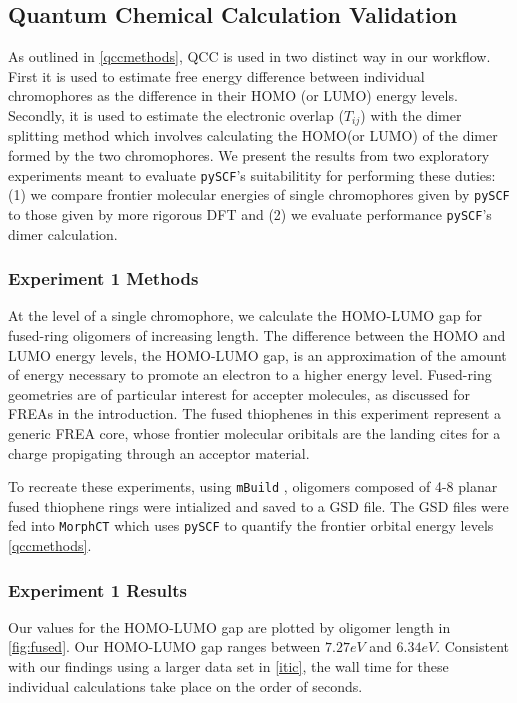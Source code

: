 \label{validation}

\subsection{Quantum Chemical Calculation Validation}

As outlined in \autoref{qccmethods}, QCC is used in two distinct way in our workflow. 
First it is used to estimate free energy
difference between individual chromophores as the difference in their HOMO (or LUMO) energy levels.
Secondly, it is used to estimate the electronic overlap ($T_{ij}$) with the dimer splitting method which involves
calculating the HOMO(or LUMO) of the dimer formed by the two chromophores. We present the results from two
exploratory experiments meant to evaluate \texttt{pySCF}'s suitabilitity for performing these duties:
(1) we compare frontier molecular energies of single chromophores given by \texttt{pySCF} to those
given by more rigorous DFT and (2) we evaluate performance \texttt{pySCF}'s dimer calculation.

\subsubsection{Experiment 1 Methods}

At the level of a single chromophore, we calculate the HOMO-LUMO gap for fused-ring
oligomers of increasing length. 
The difference between the HOMO and LUMO energy levels, the HOMO-LUMO gap, is an approximation of the amount
of energy necessary to promote an electron to a higher energy level.  
Fused-ring geometries are of particular interest for accepter
molecules, as discussed for FREAs in the introduction. 
The fused thiophenes in this experiment represent a generic FREA core, whose frontier molecular oribitals are
the landing cites for a charge propigating through an acceptor material. 

To recreate these experiments, using \texttt{mBuild} \cite{Klein2016}, oligomers composed of 4-8 planar fused thiophene rings
were intialized and saved to a GSD file. The GSD files were fed into \texttt{MorphCT} which uses \texttt{pySCF} to quantify the
frontier orbital energy levels \autoref{qccmethods}.

\subsubsection{Experiment 1 Results}

Our values for the HOMO-LUMO gap are plotted by oligomer length in \autoref{fig:fused}. 
Our HOMO-LUMO gap ranges between $7.27eV$ and $6.34eV$. Consistent with our findings using a larger data set
in \autoref{itic}, the wall time for these individual calculations take place on the order of seconds. 

